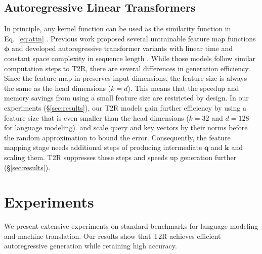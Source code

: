 \documentclass[11pt]{article}
\def\vphi{{\boldsymbol{\phi}}}
\def\vk{{\mathbf{k}}}
\def\vq{{\mathbf{q}}}
\newcommand{\TRNN}{T2R\xspace}
\begin{document}
\subsection{Autoregressive Linear Transformers}
\label{sec:linear_transformers}
In principle, any kernel function can be used as the similarity function in Eq.\ \ref{eq:attn} \cite{tsai-etal-2019-transformer}.
Previous work proposed several untrainable feature map functions $\vphi$ and developed autoregressive transformer variants with linear time and constant space complexity in sequence length \cite{katharopoulos-et-al-2020, RFA, performer}.
While those models follow similar computation steps to \TRNN, there are several differences in generation efficiency.
Since the feature map in \citet{katharopoulos-et-al-2020} preserves input dimensions, the feature size is always the same as the head dimensions ($k=d$).
This means that the speedup and memory savings from using a small feature size are restricted by design.
In our experiments (\S\ref{sec:results}), our \TRNN models gain further efficiency by using a feature size that is even smaller than the head dimensions ($k=32$ and $d=128$ for language modeling).
\citet{RFA} and \citet{performer} scale query and key vectors by their norms before the random approximation to bound the error.
Consequently, the feature mapping stage needs additional steps of producing intermediate $\vq$ and $\vk$ and scaling them.
\TRNN suppresses these steps and speeds up generation further (\S\ref{sec:results}).









\section{Experiments}
\label{sec:experiments}
We present extensive experiments on standard benchmarks for language modeling and machine translation.
Our results show that \TRNN achieves efficient autoregressive generation while retaining high accuracy.
\end{document}
